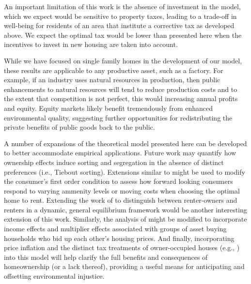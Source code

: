\documentclass[ecta,nameyear,draft]{econsocart}
\theoremstyle{plain}
\theoremstyle{remark}
\begin{document}
An important limitation of this work is the absence of investment in the model, which we expect would be sensitive to property taxes, leading to a trade-off in well-being for residents of an area that institute a corrective tax as developed above. We expect the optimal tax would be lower than presented here when the incentives to invest in new housing are taken into account.



While we have focused on single family homes in the development of our model, these results are applicable to any productive asset, such as a factory. For example, if an industry uses natural resources in production, then public enhancements to natural resources will tend to reduce production costs and to the extent that competition is not perfect, this would increasing annual profits and equity. Equity markets likely benefit tremendously from enhanced environmental quality, suggesting further opportunities for redistributing the private benefits of public goods back to the public.



A number of expansions of the theoretical model presented here can be developed to better accommodate empirical applications. Future work may quantify how ownership effects induce sorting and segregation in the absence of distinct preferences (i.e., Tiebout sorting). Extensions similar to \cite{bishop19} might be used to modify the consumer's first order condition to assess how forward looking consumers respond to varying ammenity levels or moving costs when choosing the optimal home to rent.  Extending the work of \cite{kanemoto88} to distinguish between renter-owners and renters in a dynamic, general equilibrium framework would be another interesting extension of this work. Similarly, the analysis of \cite{gervais2002} might be modified to incorporate income effects and multiplier effects associated with groups of asset buying households who bid up each other's housing prices. And finally, incorporating price inflation and the distinct tax treatments of owner-occupied  houses (e.g., \cite{poterba84}) into this model will help clarify the full benefits and consequences of homeownership (or a lack thereof), providing a useful means for anticipating and offsetting environmental injustice.
\end{document}
